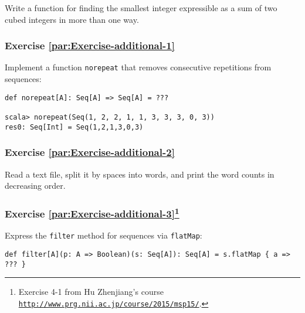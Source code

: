 Write a function for finding the smallest integer expressible as a
sum of two cubed integers in more than one way.

\subsubsection{Exercise \label{par:Exercise-additional-1}\ref{par:Exercise-additional-1}}

Implement a function \lstinline!norepeat! that removes consecutive
repetitions from sequences:
\begin{lstlisting}
def norepeat[A]: Seq[A] => Seq[A] = ???

scala> norepeat(Seq(1, 2, 2, 1, 1, 3, 3, 3, 0, 3))
res0: Seq[Int] = Seq(1,2,1,3,0,3)
\end{lstlisting}


\subsubsection{Exercise \label{par:Exercise-additional-2}\ref{par:Exercise-additional-2}}

Read a text file, split it by spaces into words, and print the word
counts in decreasing order.%
\begin{comment}
\begin{enumerate}
\item FPIS exercise 2.2: Check whether a sequence \lstinline!Seq[A]! is
sorted according to a given ordering function of type \lstinline!(A, A) => Boolean!.
\item FPIS exercise 3.24: Implement a function \lstinline!hasSubsequence!
that checks whether a \lstinline!List! contains another \lstinline!List!
as a subsequence. For instance, \lstinline!List(1,2,3,4)! would have
\lstinline!List(1,2)!, \lstinline!List(2,3)!, and \lstinline!List(4)!
as subsequences, among others. (Dynamic programming?)
\end{enumerate}
\end{comment}


\subsubsection{Exercise \label{par:Exercise-additional-3}\ref{par:Exercise-additional-3}\protect\footnote{Exercise 4-1 from Hu Zhenjiang\textsf{'}s course \texttt{\protect\href{http://www.prg.nii.ac.jp/course/2015/msp15/}{http://www.prg.nii.ac.jp/course/2015/msp15/}}.}}

Express the \lstinline!filter! method for sequences via \lstinline!flatMap!:
\begin{lstlisting}
def filter[A](p: A => Boolean)(s: Seq[A]): Seq[A] = s.flatMap { a => ??? }
\end{lstlisting}


